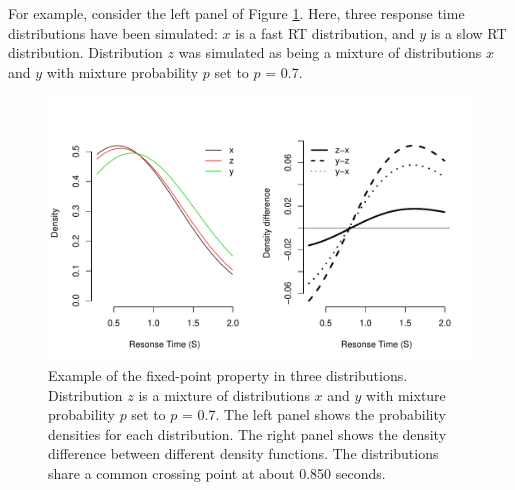 \documentclass[a4paper, man, natbib]{apa6}
\begin{document}
For example, consider the left panel of Figure \ref{fig:fpExample}. Here, three response time distributions have been simulated: $x$ is a fast RT distribution, and $y$ is a slow RT distribution. Distribution $z$ was simulated as being a mixture of distributions $x$ and $y$ with mixture probability $p$ set to $p$ = 0.7.  

\begin{figure}
\begin{center}
\includegraphics[width = \textwidth]{Images/fpExample.pdf}
\caption{Example of the fixed-point property in three distributions. Distribution $z$ is a mixture of distributions $x$ and $y$ with mixture probability $p$ set to $p$ = 0.7. The left panel shows the probability densities for each distribution. The right panel shows the density difference between different density functions. The distributions share a common crossing point at about 0.850 seconds.}
\label{fig:fpExample}
\end{center}
\end{figure}
\end{document}
